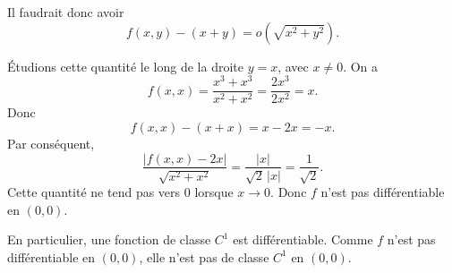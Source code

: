 {\begin{enumerate}
{Il faudrait donc avoir
\[
f(x,y)-(x+y)=o\!\left(\sqrt{x^2+y^2}\right).
\]

Étudions cette quantité le long de la droite $y=x$, avec $x\neq 0$. On a
\[
f(x,x)=\frac{x^3+x^3}{x^2+x^2}=\frac{2x^3}{2x^2}=x.
\]
Donc
\[
f(x,x)-(x+x)=x-2x=-x.
\]
Par conséquent,
\[
\frac{|f(x,x)-2x|}{\sqrt{x^2+x^2}}
=
\frac{|x|}{\sqrt{2}\,|x|}
=
\frac{1}{\sqrt2}.
\]
Cette quantité ne tend pas vers $0$ lorsque $x\to 0$. Donc $f$ n’est pas différentiable en $(0,0)$.

En particulier, une fonction de classe $C^1$ est différentiable. Comme $f$ n’est pas différentiable en $(0,0)$, elle n’est pas de classe $C^1$ en $(0,0)$.
}

\end{enumerate}

}